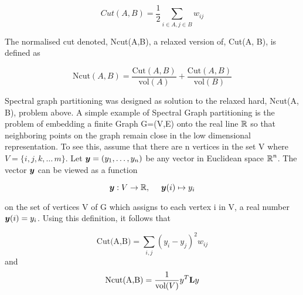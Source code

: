 \begin{equation}\label{cut}
Cut(A,B) = \displaystyle \frac{1}{2} \sum_{i \in A,  j \in B } w_{ij} 
\end{equation}


The normalised cut denoted, Ncut(A,B), a relaxed version of, Cut(A, B), is defined as

\begin{equation}\label{Ncut}
\displaystyle \text{Ncut}(A,B) = \frac{\text{Cut}(A, B)}{\text{vol}(A)}
+ \frac{\text{Cut}(A, B)}{\text{vol}(B)} 
\end{equation}

Spectral graph partitioning\cite{Luxburg2007} was designed as solution to the relaxed hard, Ncut(A, B), problem above.
A simple example of Spectral Graph partitioning is the problem of embedding a finite Graph G=(V,E) onto the real line $\operatorname{\mathbb{R}}$ so that neighboring points on the graph remain  close in the low dimensional representation. To see this, assume that there are n vertices in the set V where $V = \{i, j, k, \ldots\, m\}.$
Let $\boldsymbol{y} = (y_{1}, \ldots, y_{n})$  be any vector in Euclidean space $\operatorname{\mathbb{R}}^{n}$. The vector $\boldsymbol{y}$ can be viewed as a function

\[ \vect{y}: V \rightarrow \mathbb{R}, \ \  \ \  \vect{y}(i) \mapsto y_i \]

on the set of vertices V of  G which assigns to each vertex i in V, a real number $\boldsymbol{y}(i) = y_{i}$.  Using this definition, it follows that

\begin{equation}\label{Ccut}
\text{Cut(A,B)} = \displaystyle{ \sum_{i,j} (y_{i} - y_{j})^{2}w_{ij} }
\end{equation}
and
\begin{equation}\label{Nncut}
\text{Ncut(A,B)} = \displaystyle{ \frac{1}{\text{vol}(V)} y^{T}\textbf{L}y}   
\end{equation}

